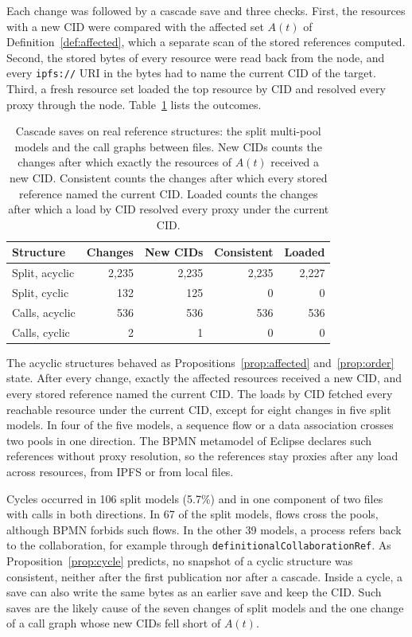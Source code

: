 \documentclass[5p,times,twocolumn]{elsarticle}
\theoremstyle{definition}
\theoremstyle{plain}
\begin{document}
Each change was followed by a cascade save and three checks. First, the resources with a new CID were compared with the affected set $A(t)$ of Definition~\ref{def:affected}, which a separate scan of the stored references computed. Second, the stored bytes of every resource were read back from the node, and every \texttt{ipfs://} URI in the bytes had to name the current CID of the target. Third, a fresh resource set loaded the top resource by CID and resolved every proxy through the node. Table~\ref{tab:rq2-real} lists the outcomes.

\begin{table}[t]
\caption{Cascade saves on real reference structures: the split multi-pool models and the call graphs between files. New CIDs counts the changes after which exactly the resources of $A(t)$ received a new CID. Consistent counts the changes after which every stored reference named the current CID. Loaded counts the changes after which a load by CID resolved every proxy under the current CID.}\label{tab:rq2-real}
\setlength{\tabcolsep}{4pt}
\begin{tabular*}{\columnwidth}{@{\extracolsep{\fill}}lrrrr@{}}
\toprule
Structure & Changes & New CIDs & Consistent & Loaded \\
\midrule
Split, acyclic & 2,235 & 2,235 & 2,235 & 2,227 \\
Split, cyclic & 132 & 125 & 0 & 0 \\
Calls, acyclic & 536 & 536 & 536 & 536 \\
Calls, cyclic & 2 & 1 & 0 & 0 \\
\bottomrule
\end{tabular*}
\end{table}

The acyclic structures behaved as Propositions~\ref{prop:affected} and~\ref{prop:order} state. After every change, exactly the affected resources received a new CID, and every stored reference named the current CID. The loads by CID fetched every reachable resource under the current CID, except for eight changes in five split models. In four of the five models, a sequence flow or a data association crosses two pools in one direction. The BPMN metamodel of Eclipse declares such references without proxy resolution, so the references stay proxies after any load across resources, from IPFS or from local files.

Cycles occurred in 106 split models (5.7\%) and in one component of two files with calls in both directions. In 67 of the split models, flows cross the pools, although BPMN forbids such flows. In the other 39 models, a process refers back to the collaboration, for example through \texttt{definitionalCollaborationRef}. As Proposition~\ref{prop:cycle} predicts, no snapshot of a cyclic structure was consistent, neither after the first publication nor after a cascade. Inside a cycle, a save can also write the same bytes as an earlier save and keep the CID. Such saves are the likely cause of the seven changes of split models and the one change of a call graph whose new CIDs fell short of $A(t)$.
\end{document}
